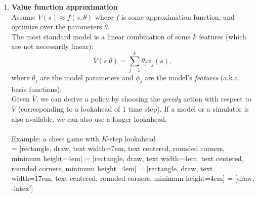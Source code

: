 \begin{enumerate}
\item \textbf{Value function approximation}\\
Assume $V(s)\approx f(s,\theta)$ where $f$ is some approximation function, and optimize over the parameters $\theta$.\\
The most standard model is a linear combination of some $k$ features (which are not necessarily linear):
$$\bar{V}(s|\theta) = \sum_{j=1}^k \theta_j \phi_j(s),$$
where $\theta_j$ are the model parameters and $\phi_j$ are the model's \emph{features} (a.k.a. basis functions).\\
Given $\bar{V}$, we can derive a policy by choosing the \emph{greedy} action with respect to $\bar{V}$ (corresponding to a lookahead of 1 time step). If a model or a simulator is also available, we can also use a longer lookahead.\\
\\
Example: a chess game with $K$-step lookahead\\
 = [rectangle, draw,
    text width=7em, text centered, rounded corners, minimum height=4em]
 = [rectangle, draw,
    text width=4em, text centered, rounded corners, minimum height=4em]
 = [rectangle, draw,
    text width=17em, text centered, rounded corners, minimum height=4em]
 = [draw, -latex']


\end{enumerate}
